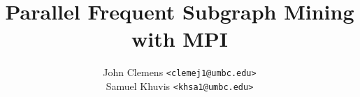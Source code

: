 \documentclass{article}
\title{Parallel Frequent Subgraph Mining with MPI}
\author{John Clemens \texttt{<clemej1@umbc.edu>} \\
	Samuel Khuvis \texttt{<khsa1@umbc.edu>}}
\begin{document}
\maketitle







{}

\end{document}
